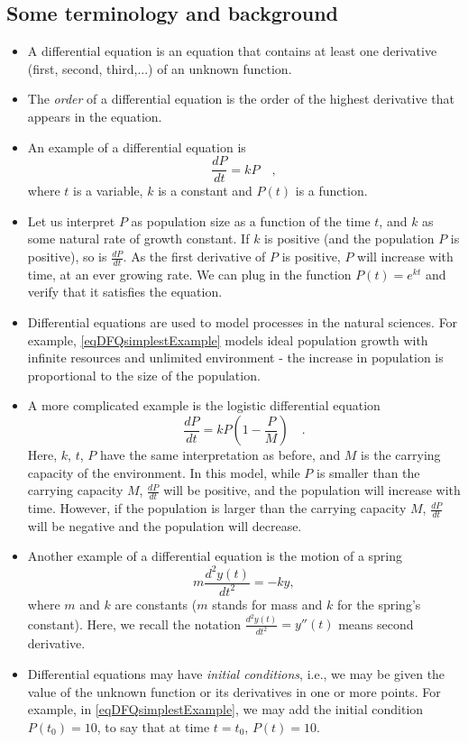 \documentclass[12pt]{book}
\begin{document}
\subsection{Some terminology and background}
\begin{itemize}
\item A differential equation is an equation that contains at least one derivative (first, second, third,...) of an unknown function. 
\item The \emph{order} of a differential equation is the order of the highest derivative that appears in the equation.
\item An example of a differential equation is
\begin{equation}\label{eqDFQsimplestExample}
\frac{dP}{dt} = k P\quad ,
\end{equation}
where $t$ is a variable, $k$ is a constant and $P(t)$ is a function.
\item Let us interpret $P$ as population size as a function of the time $t$, and $k$ as some natural rate of growth constant. If $k$ is positive (and the population $P$ is positive), so is $\frac{d P}{dt}$. As the first derivative of $P$ is positive, $P$ will increase with time, at an ever growing rate. We can plug in the function $P(t)= e^{k t}$ and verify that it satisfies the equation.
\item Differential equations are used to model processes in the natural sciences. For example, \ref{eqDFQsimplestExample} models ideal population growth with infinite resources and unlimited environment - the increase in population is proportional to the size of the population.
\item A more complicated example is the logistic differential equation 
\[
\frac{d P }{dt} = k P(1- \frac{P}{M})\quad.
\]
Here, $k$, $t$, $P$ have the same interpretation as before, and $M$ is the carrying capacity of the environment. In this model, while $P$ is smaller than the carrying capacity $M$,  $\frac{dP}{dt}$ will be positive, and the population will increase with time. However, if the population is larger than the carrying capacity $M$, $\frac{d P }{dt}$ will be negative and the population will decrease.
\item Another example of a differential equation is the motion of a spring
\[
m\frac{d^2 y (t)}{dt^2}= -k y,
\]
where $m$ and $k$ are constants ($m$ stands for mass and $k$ for the spring's constant). Here, we recall the notation $\frac{d^2 y (t)}{dt^2}= y''(t)$ means second derivative.

\item Differential equations may have \emph{initial conditions}, i.e., we may be given the value of the unknown function or its derivatives in one or more points. For example, in \eqref{eqDFQsimplestExample}, we may add the initial condition $P(t_0)= 10$, to say that at time $t=t_0$, $P(t)=10$. 


\end{itemize}
\end{document}
